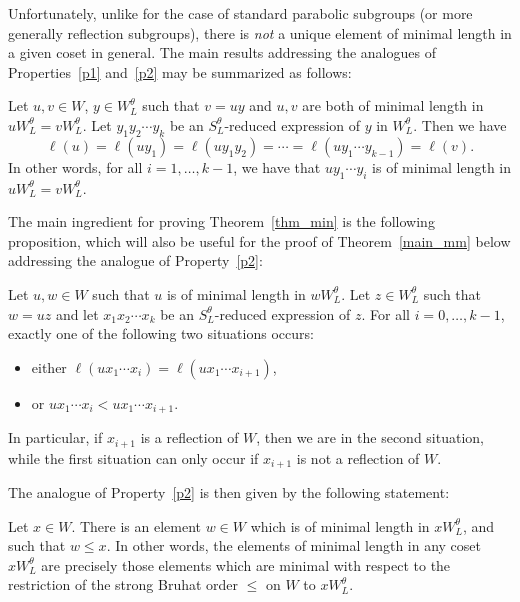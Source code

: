 \documentclass[ALCO, Unicode]{cedram}
\begin{document}
Unfortunately, unlike for the case of standard parabolic subgroups (or more generally reflection subgroups), there is \textit{not} a unique element of minimal length in a given coset in general. The main results addressing the analogues of Properties~\ref{p1} and~\ref{p2} may be summarized as follows: 

\begin{theorem}\label{thm_min}
Let $u,v\in W$, $y\in W_L^\theta$ such that $v=uy$ and $u,v$ are both of minimal length in $u W_L^\theta= v W_L^\theta$. Let $y_1 y_2 \cdots y_k$ be an $S_L^\theta$-reduced expression of $y$ in $W_L^\theta$. Then we have $$\ell(u)=\ell(uy_1)=\ell(uy_1 y_2)=\cdots =\ell(u y_1 \cdots y_{k-1})=\ell(v).$$
In other words, for all $i=1, \dots, k-1$, we have that $u y_1 \cdots y_i$ is of minimal length in $uW_L^\theta=v W_L^\theta$.  
\end{theorem}    



The main ingredient for proving Theorem~\ref{thm_min} is the following proposition, which will also be useful for the proof of Theorem~\ref{main_mm} below addressing the analogue of Property~\ref{p2}: 

\begin{prop}\label{prop_esc}
Let $u, w\in W$ such that $u$ is of minimal length in $w W_L^\theta$. Let $z\in W_L^\theta$ such that $w=uz$ and let $x_1 x_2 \cdots x_k$ be an $S_L^\theta$-reduced expression of $z$. For all $i=0, \dots, k-1$, exactly one of the following two situations occurs:
\begin{itemize}
	\item either $\ell(u x_1 \cdots x_i)=\ell(u x_1 \cdots x_{i+1})$, 
	\item or $u x_1 \cdots x_i < u x_1 \cdots x_{i+1}$.
\end{itemize}
In particular, if $x_{i+1}$ is a reflection of $W$, then we are in the second situation, while the first situation can only occur if $x_{i+1}$ is not a reflection of $W$. 
\end{prop}

The analogue of Property~\ref{p2} is then given by the following statement:

\begin{theorem}\label{main_mm}
Let $x\in W$. There is an element $w\in W$ which is of minimal length in $x W_L^\theta$, and such that $w \leq x$. In other words, the elements of minimal length in any coset $x W_L^\theta$ are precisely those elements which are minimal with respect to the restriction of the strong Bruhat order $\leq$ on $W$ to $x W_L^\theta$. 
\end{theorem}
\end{document}
